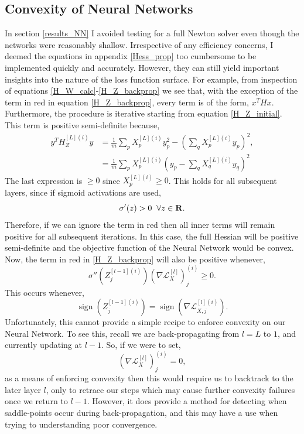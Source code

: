 \documentclass[11pt,twocolumn]{article}
\DeclareMathOperator*{\sgn}{sign}
\begin{document}
\subsection{Convexity of Neural Networks}\label{app_convex}
In section \ref{results_NN} I avoided testing for a full Newton solver even though the networks were reasonably shallow. Irrespective of any efficiency concerns, I deemed the equations in appendix \ref{Hess_prop} too cumbersome to be implemented quickly and accurately. However, they can still yield important insights into the nature of the loss function surface.
For example, from inspection of equations \ref{H_W_calc}-\ref{H_Z_backprop} we see that, with the exception of the term in red in equation \ref{H_Z_backprop}, every term is of the form, $x^{T}Hx$. Furthermore, the procedure is iterative starting from equation \ref{H_Z_initial}. This term is positive semi-definite because,
\begin{align}
y^T H_{Z}^{[L](i)}y&=\frac{1}{m} \sum_p  X^{[L](i)}_p y_p^2 -(\sum_q X^{[L](i)}_p y_p)^2,\nonumber\\
&=\frac{1}{m} \sum_p X^{[L](i)}_p(y_p-\sum_q X^{[L](i)}_q y_q)^2
\end{align}
The last expression is $\ge 0$ since $X^{[L](i)}_p \ge 0$. This holds for all subsequent layers, since if sigmoid activations are used, 
\begin{equation}
\sigma'(z) >0 \hspace{0.2cm} \forall z \in \mathbf{R}.
\end{equation}
Therefore, if we can ignore the term in red then all inner terms will remain positive for all subsequent iterations. In this case, the full Hessian will be positive semi-definite and the objective function of the Neural Network would be convex. Now, the term in red in \ref{H_Z_backprop} will also be positive whenever,
\begin{equation}
\sigma''{(Z_j^{[l-1](i)})} \left(\nabla \mathcal{L}^{[l]}_{X}\right)_j^{(i)}\ge 0.
\end{equation}
This occurs whenever,
\begin{equation}
\sgn{\left(Z_j^{[l-1](i)}\right)}= \sgn{\left(\nabla \mathcal{L}^{[l](i)}_{X,j} \right)}.
\end{equation}
Unfortunately, this cannot provide a simple recipe to enforce convexity on our Neural Network. To see this, recall we are back-propagating from $l=L$ to $1$, and currently updating at $l-1$. So, if we were to set, 
\begin{equation}
\left(\nabla \mathcal{L}^{[l]}_{X}\right)_j^{(i)} = 0,
\end{equation}
as a means of enforcing convexity then this would require us to backtrack to the later layer $l$, only to retrace our steps which may cause further convexity failures once we return to $l-1$. However, it does provide a method for detecting when saddle-points occur during back-propagation, and this may have a use when trying to understanding poor convergence.
\end{document}

